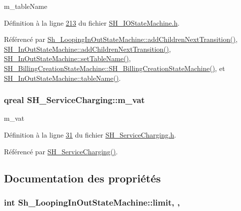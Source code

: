 m\-\_\-table\-Name 



Définition à la ligne \hyperlink{SH__IOStateMachine_8h_source_l00213}{213} du fichier \hyperlink{SH__IOStateMachine_8h_source}{S\-H\-\_\-\-I\-O\-State\-Machine.\-h}.



Référencé par \hyperlink{classSh__LoopingInOutStateMachine_acfd8d0711c793b13c759f6c50be6a315}{Sh\-\_\-\-Looping\-In\-Out\-State\-Machine\-::add\-Children\-Next\-Transition()}, \hyperlink{classSH__InOutStateMachine_a689e5513ef6ef3fc1598efacd413372e}{S\-H\-\_\-\-In\-Out\-State\-Machine\-::add\-Children\-Next\-Transition()}, \hyperlink{classSH__InOutStateMachine_a437a730d07ddd15bd96314ab0b6cf40e}{S\-H\-\_\-\-In\-Out\-State\-Machine\-::set\-Table\-Name()}, \hyperlink{classSH__BillingCreationStateMachine_ad62b77fa4aeafe200056ff3974562f83}{S\-H\-\_\-\-Billing\-Creation\-State\-Machine\-::\-S\-H\-\_\-\-Billing\-Creation\-State\-Machine()}, et \hyperlink{classSH__InOutStateMachine_a18b07a985695100612bbcbda870933b4}{S\-H\-\_\-\-In\-Out\-State\-Machine\-::table\-Name()}.

\hypertarget{classSH__ServiceCharging_ae2fa75c56883dc4af6b0bbcbb86d0861}{
\subsubsection[{m\-\_\-vat}]{\setlength{\rightskip}{0pt plus 5cm}qreal S\-H\-\_\-\-Service\-Charging\-::m\-\_\-vat\hspace{0.3cm}{\ttfamily [private]}}}\label{classSH__ServiceCharging_ae2fa75c56883dc4af6b0bbcbb86d0861}


m\-\_\-vat 



Définition à la ligne \hyperlink{SH__ServiceCharging_8h_source_l00031}{31} du fichier \hyperlink{SH__ServiceCharging_8h_source}{S\-H\-\_\-\-Service\-Charging.\-h}.



Référencé par \hyperlink{classSH__ServiceCharging_afa5273d046049b1c2b020a6a19a8290b}{S\-H\-\_\-\-Service\-Charging()}.



\subsection{Documentation des propriétés}
\hypertarget{classSh__LoopingInOutStateMachine_aea47cac4b5f895ba85604cdce1160ccd}{
\subsubsection[{limit}]{\setlength{\rightskip}{0pt plus 5cm}int Sh\-\_\-\-Looping\-In\-Out\-State\-Machine\-::limit\hspace{0.3cm}{\ttfamily [read]}, {\ttfamily [write]}, {\ttfamily [inherited]}}}\label{classSh__LoopingInOutStateMachine_aea47cac4b5f895ba85604cdce1160ccd}


